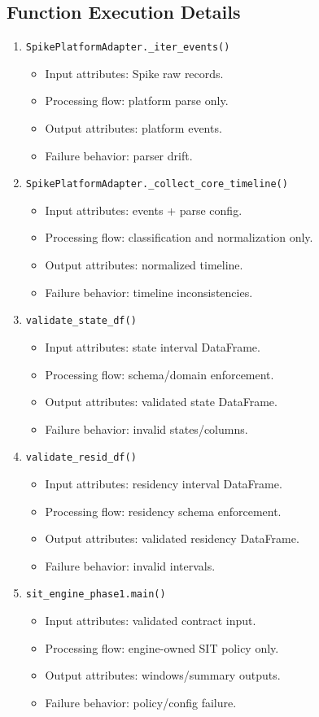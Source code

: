 \documentclass[11pt,a4paper]{article}
\begin{document}
\subsection*{Function Execution Details}
\begin{enumerate}[leftmargin=*]
  \item \texttt{SpikePlatformAdapter.\_iter\_events()}
  \begin{itemize}[leftmargin=*]
    \item Input attributes: Spike raw records.
    \item Processing flow: platform parse only.
    \item Output attributes: platform events.
    \item Failure behavior: parser drift.
  \end{itemize}
  \item \texttt{SpikePlatformAdapter.\_collect\_core\_timeline()}
  \begin{itemize}[leftmargin=*]
    \item Input attributes: events + parse config.
    \item Processing flow: classification and normalization only.
    \item Output attributes: normalized timeline.
    \item Failure behavior: timeline inconsistencies.
  \end{itemize}
  \item \texttt{validate\_state\_df()}
  \begin{itemize}[leftmargin=*]
    \item Input attributes: state interval DataFrame.
    \item Processing flow: schema/domain enforcement.
    \item Output attributes: validated state DataFrame.
    \item Failure behavior: invalid states/columns.
  \end{itemize}
  \item \texttt{validate\_resid\_df()}
  \begin{itemize}[leftmargin=*]
    \item Input attributes: residency interval DataFrame.
    \item Processing flow: residency schema enforcement.
    \item Output attributes: validated residency DataFrame.
    \item Failure behavior: invalid intervals.
  \end{itemize}
  \item \texttt{sit\_engine\_phase1.main()}
  \begin{itemize}[leftmargin=*]
    \item Input attributes: validated contract input.
    \item Processing flow: engine-owned SIT policy only.
    \item Output attributes: windows/summary outputs.
    \item Failure behavior: policy/config failure.
  \end{itemize}
\end{enumerate}
\end{document}
